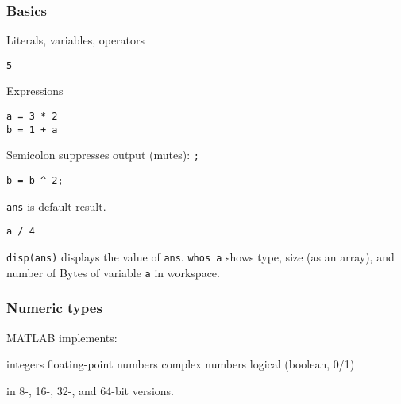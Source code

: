 \documentclass[11pt]{beamer}
\begin{document}
\begin{frame}[fragile]
  \frametitle{Basics}
  \Enlarge

  \begin{enumerate}
  \myitem  Literals, variables, operators
  \end{enumerate}
  \begin{Verbatim}
5
  \end{Verbatim}
  \begin{enumerate}
  \myitem  Expressions
  \end{enumerate}
  \begin{Verbatim}
a = 3 * 2
b = 1 + a
  \end{Verbatim}
  \begin{enumerate}
  \myitem  Semicolon suppresses output (mutes):  \texttt{;}
  \end{enumerate}
  \begin{Verbatim}
b = b ^ 2;
  \end{Verbatim}
  \begin{enumerate}
  \myitem  \texttt{ans} is default result.
  \end{enumerate}
  \begin{Verbatim}
a / 4
  \end{Verbatim}
  \begin{enumerate}
  \myitem  \texttt{disp(ans)} displays the value of \texttt{ans}.
  \myitem  \texttt{whos a} shows type, size (as an array), and number of Bytes of  variable \texttt{a} in workspace.
  \end{enumerate}
\end{frame}

\begin{frame}[fragile]
  \frametitle{Numeric types}
  \Enlarge

  \begin{enumerate}
  \myitem  MATLAB implements:
    \begin{enumerate}
    \mysubitem  integers
    \mysubitem  floating-point numbers
    \mysubitem  complex numbers
    \mysubitem  logical (boolean, 0/1)
    \end{enumerate}
  \myitem  in 8-, 16-, 32-, and 64-bit versions.
  \end{enumerate}
\end{frame}
\end{document}
